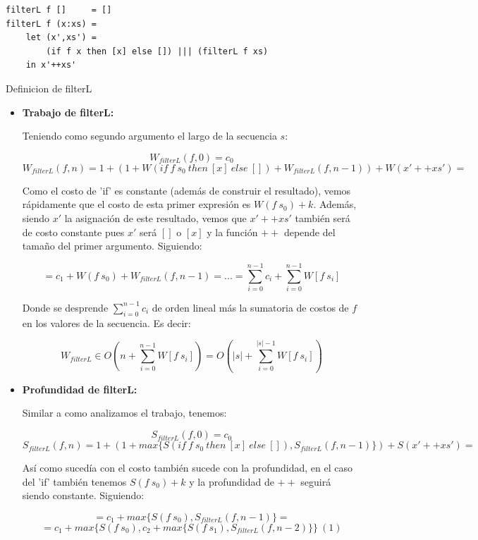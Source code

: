 \documentclass[12pt]{article}
\begin{document}
\begin{table}[h]
\begin{lstlisting}
filterL f []     = []
filterL f (x:xs) = 
    let (x',xs') = 
        (if f x then [x] else []) ||| (filterL f xs) 
    in x'++xs'
\end{lstlisting}
\caption{Definicion de filterL}
\end{table}
\begin{itemize}

\item \textbf{Trabajo de filterL:}

    Teniendo como segundo argumento el largo de la secuencia $s$:

    $$ W_{filterL}(f, 0) = c_0 $$
    $$ W_{filterL}(f, n) = 1 + ( 1 + W(if\ f\ s_0\ then\ [x]\ else\ []) + W_{filterL}(f, n-1) ) + W(x'++xs') = $$

    Como el costo de 'if' es constante (además de construir el resultado), vemos rápidamente que el costo de esta primer expresión es $W(f\ s_0) + k$.
    Además, siendo $x'$ la asignación de este resultado, vemos que $x'++xs'$ también será de costo constante pues $x'$ será $[]$ o $[x]$ y la función $++$ depende del tamaño del primer argumento. Siguiendo:

    $$ = c_1 + W(f\ s_0) + W_{filterL}(f, n-1) = ... = \sum\limits_{i=0}^{n-1} c_i + \sum\limits_{i=0}^{n-1} W[f\ s_i] $$

    Donde se desprende $\sum\limits_{i=0}^{n-1} c_i$ de orden lineal más la sumatoria de costos de $f$ en los valores de la secuencia. Es decir:

    $$ W_{filterL} \in O(n + \sum\limits_{i=0}^{n-1} W[f\ s_i] ) = O(|s| + \sum\limits_{i=0}^{|s|-1} W[f\ s_i]) $$

\item \textbf{Profundidad de filterL:}

    Similar a como analizamos el trabajo, tenemos:

    $$ S_{filterL}(f, 0) = c_0 $$
    $$ S_{filterL}(f, n) = 1 + ( 1 + max\{ S(if\ f\ s_0\ then\ [x]\ else\ []), S_{filterL}(f, n-1)\} ) + S(x'++xs') = $$

    Así como sucedía con el costo también sucede con la profundidad, en el caso del 'if' también tenemos $S(f\ s_0) + k$ y la profundidad de $++$ seguirá siendo constante. Siguiendo:

    $$ = c_1 + max\{ S(f\ s_0), S_{filterL}(f, n-1) \} = $$
    $$ = c_1 + max\{ S(f\ s_0), c_2 + max\{S(f\ s_1), S_{filterL}(f, n-2) \} \} \ (1) $$


\end{itemize}
\end{document}
